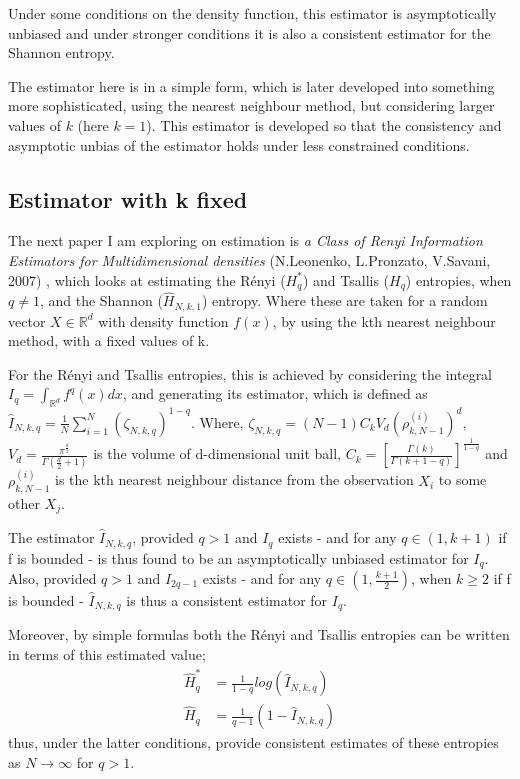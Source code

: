 \documentclass{report}
\begin{document}
Under some conditions on the density function, this estimator is asymptotically unbiased and under stronger conditions it is also a consistent estimator for the Shannon entropy. 

The estimator here is in a simple form, which is later developed into something more sophisticated, using the nearest neighbour method, but considering larger values of $k$ (here $k=1$). This estimator is developed so that the consistency and asymptotic unbias of the estimator holds under less constrained conditions.



\subsection{Estimator with k fixed} \label{fixed_k}

The next paper I am exploring on estimation is \textit{a Class of Renyi Information Estimators for Multidimensional densities} (N.Leonenko, L.Pronzato, V.Savani, 2007) \cite{paper3}, which looks at estimating the R\'enyi ($H_{q}^{*}$) and Tsallis ($H_{q}$) entropies, when $q \neq 1$, and the Shannon ($\hat{H}_{N, k, 1}$) entropy. Where these are taken for a random vector $X \in \mathbb{R}^d$ with density function $f(x)$, by using the kth nearest neighbour method, with a fixed values of k. 

For the R\'enyi and Tsallis entropies, this is achieved by considering the integral  $I_{q} = \int_{\mathbb{R}^d} f^q (x) dx$, and generating its estimator, which is defined as $\hat{I}_{N, k, q} = \frac{1}{N} \sum_{i=1}^{N} (\zeta_{N, k, q})^{1-q}$. Where, $\zeta_{N, k ,q} = (N-1)C_{k}V_{d}(\rho_{k, N-1}^{(i)})^d$,  $V_{d} = \frac{\pi^{\frac{d}{2}}}{\Gamma(\frac{d}{2} + 1 )}$ is the volume of d-dimensional unit ball, $C_{k} = \left[ \frac{\Gamma(k)}{\Gamma(k+1-q)} \right]^{\frac{1}{1-q}}$ and $\rho_{k, N-1}^{(i)}$ is the kth nearest neighbour distance from the observation $X_{i}$ to some other $X_{j}$.

The estimator $\hat{I}_{N, k, q}$, provided $q>1$ and $I_{q}$ exists - and for any $q \in (1, k+1)$ if f is bounded - is thus found to be an asymptotically unbiased estimator for $I_{q}$. Also, provided  $q>1$ and $I_{2q-1}$ exists -  and for any $q \in (1, \frac{k+1}{2})$, when $k \geq 2$ if f is bounded - $\hat{I}_{N, k, q}$ is thus a consistent estimator for $I_{q}$.

Moreover, by simple formulas both the R\'enyi and Tsallis entropies can be written in terms of this estimated value; 
\begin{align}
\hat{H}_{q}^{*} &= \frac{1}{1-q} log(\hat{I}_{N, k, q}) \\
\hat{H}_{q} &= \frac{1}{q-1} (1 - \hat{I}_{N, k, q})
\end{align}
thus, under the latter conditions, provide consistent estimates of these entropies as $N \to \infty$ for $q > 1$.
\end{document}
